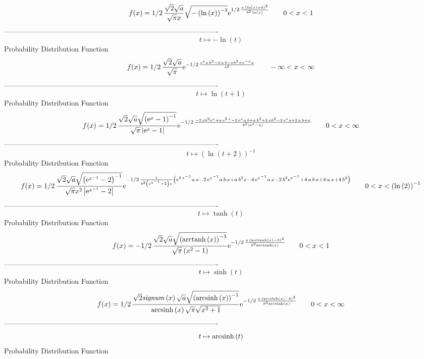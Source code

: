\documentclass[12pt]{article}
\begin{document}
$$  f(x)=1/2\,{\frac {\sqrt {2}\sqrt {a}}{\sqrt {\pi}x}\sqrt {- \left( \ln 
 \left( x \right)  \right) ^{-3}}{{\rm e}^{1/2\,{\frac {a\, \left( 
\ln  \left( x \right) +b \right) ^{2}}{{b}^{2}\ln  \left( x \right) }}
}}}
 \qquad0
 < x < 1
$$-------------------------------------------------------------------------------------------  \\$$t\mapsto -\ln  \left( t \right) 
$$Probability Distribution Function 
$$  f(x)=1/2\,{\frac {\sqrt {2}\sqrt {a}}{\sqrt {\pi}}{{\rm e}^{-1/2\,{\frac {{
{\rm e}^{x}}a\,{b}^{2}-2\,a\,b-x{b}^{2}+{{\rm e}^{-x}}a}{{b}^{2}}}}}}
 \qquad-\infty 
 < x < \infty 
$$-------------------------------------------------------------------------------------------  \\$$t\mapsto \ln  \left( t+1 \right) 
$$Probability Distribution Function 
$$  f(x)=1/2\,{\frac {\sqrt {2}\sqrt {a}\sqrt { \left( {{\rm e}^{x}}-1 \right) 
^{-1}}}{\sqrt {\pi} \left| {{\rm e}^{x}}-1 \right| }{{\rm e}^{-1/2\,{
\frac {-2\,x{b}^{2}{{\rm e}^{x}}+a\,{{\rm e}^{2\,x}}-2\,{{\rm e}^{x}}a
\,b+a\,{b}^{2}+2\,x{b}^{2}-2\,{{\rm e}^{x}}a+2\,a\,b+a}{{b}^{2}
 \left( {{\rm e}^{x}}-1 \right) }}}}}
 \qquad0
 < x < \infty 
$$-------------------------------------------------------------------------------------------  \\$$t\mapsto  \left( \ln  \left( t+2 \right)  \right) ^{-1}
$$Probability Distribution Function 
$$  f(x)=1/2\,{\frac {\sqrt {2}\sqrt {a}\sqrt { \left( {{\rm e}^{{x}^{-1}}}-2
 \right) ^{-1}}}{\sqrt {\pi}{x}^{2} \left| {{\rm e}^{{x}^{-1}}}-2
 \right| }{{\rm e}^{-1/2\,{\frac {1}{{b}^{2} \left( {{\rm e}^{{x}^{-1}
}}-2 \right) x} \left( {{\rm e}^{2\,{x}^{-1}}}a\,x-2\,{{\rm e}^{{x}^{-
1}}}a\,b\,x+a\,{b}^{2}x-4\,{{\rm e}^{{x}^{-1}}}a\,x-2\,{b}^{2}{{\rm e}
^{{x}^{-1}}}+4\,a\,b\,x+4\,a\,x+4\,{b}^{2} \right) }}}}
 \qquad0
 < x <  \left( \ln  \left( 2 \right)  \right) ^{-1}
$$-------------------------------------------------------------------------------------------  \\$$t\mapsto \tanh \left( t \right) 
$$Probability Distribution Function 
$$  f(x)=-1/2\,{\frac {\sqrt {2}\sqrt {a}\sqrt { \left( {\rm arctanh} \left(x
\right) \right) ^{-3}}}{\sqrt {\pi} \left( {x}^{2}-1 \right) }{{\rm e}
^{-1/2\,{\frac {a\, \left( {\rm arctanh} \left(x\right)-b \right) ^{2}
}{{b}^{2}{\rm arctanh} \left(x\right)}}}}}
 \qquad0
 < x < 1
$$-------------------------------------------------------------------------------------------  \\$$t\mapsto \sinh \left( t \right) 
$$Probability Distribution Function 
$$  f(x)=1/2\,{\frac {\sqrt {2}{\it signum} \left( x \right) \sqrt {a}\sqrt {
 \left( {\rm arcsinh} \left(x\right) \right) ^{-1}}}{{\rm arcsinh} 
\left(x\right)\sqrt {\pi}\sqrt {{x}^{2}+1}}{{\rm e}^{-1/2\,{\frac {a\,
 \left( {\rm arcsinh} \left(x\right)-b \right) ^{2}}{{b}^{2}
{\rm arcsinh} \left(x\right)}}}}}
 \qquad0
 < x < \infty 
$$-------------------------------------------------------------------------------------------  \\$$t\mapsto {\rm arcsinh} \left(t\right)
$$Probability Distribution Function 
\end{document}
